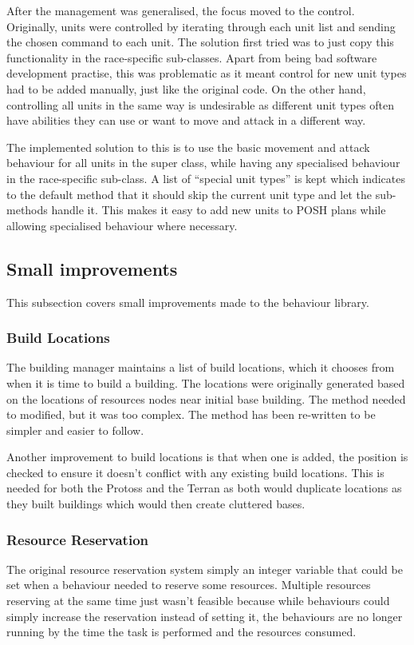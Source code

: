 \documentclass[11pt,openright,a4paper]{report}
\begin{document}
After the management was generalised, the focus moved to the control. Originally, units were controlled by iterating through each unit list and sending the chosen command to each unit. The solution first tried was to just copy this functionality in the race-specific sub-classes. Apart from being bad software development practise, this was problematic as it meant control for new unit types had to be added manually, just like the original code. On the other hand, controlling all units in the same way is undesirable as different unit types often have abilities they can use or want to move and attack in a different way.

The implemented solution to this is to use the basic movement and attack behaviour for all units in the super class, while having any specialised behaviour in the race-specific sub-class. A list of ``special unit types'' is kept which indicates to the default method that it should skip the current unit type and let the sub-methods handle it. This makes it easy to add new units to POSH plans while allowing specialised behaviour where necessary.

\subsection{Small improvements}
This subsection covers small improvements made to the behaviour library.
\subsubsection{Build Locations}
The building manager maintains a list of build locations, which it chooses from when it is time to build a building. The locations were originally generated based on the locations of resources nodes near initial base building. The method needed to modified, but it was too complex. The method has been re-written to be simpler and easier to follow.

Another improvement to build locations is that when one is added, the position is checked to ensure it doesn't conflict with any existing build locations. This is needed for both the Protoss and the Terran as both would duplicate locations as they built buildings which would then create cluttered bases.
\subsubsection{Resource Reservation}
The original resource reservation system simply an integer variable that could be set when a behaviour needed to reserve some resources. Multiple resources reserving at the same time just wasn't feasible because while behaviours could simply increase the reservation instead of setting it, the behaviours are no longer running by the time the task is performed and the resources consumed.
\end{document}
